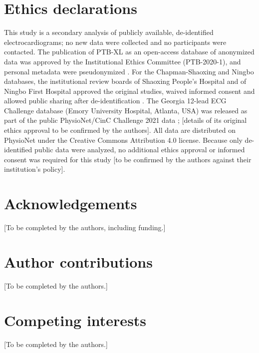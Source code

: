 \documentclass{wlscirep}
\begin{document}
\section*{Ethics declarations}
This study is a secondary analysis of publicly available, de-identified electrocardiograms; no new data were collected and no participants were contacted. The publication of PTB-XL as an open-access database of anonymized data was approved by the Institutional Ethics Committee (PTB-2020-1), and personal metadata were pseudonymized \cite{wagner2020ptbxl}. For the Chapman-Shaoxing and Ningbo databases, the institutional review boards of Shaoxing People's Hospital and of Ningbo First Hospital approved the original studies, waived informed consent and allowed public sharing after de-identification \cite{zheng2020chapman,zheng2022ningbo}. The Georgia 12-lead ECG Challenge database (Emory University Hospital, Atlanta, USA) was released as part of the public PhysioNet/CinC Challenge 2021 data \cite{reyna2021challenge,reyna2022challengedata}; [details of its original ethics approval to be confirmed by the authors]. All data are distributed on PhysioNet under the Creative Commons Attribution 4.0 license. Because only de-identified public data were analyzed, no additional ethics approval or informed consent was required for this study [to be confirmed by the authors against their institution's policy].



\section*{Acknowledgements}
[To be completed by the authors, including funding.]

\section*{Author contributions}
[To be completed by the authors.]

\section*{Competing interests}
[To be completed by the authors.]
\end{document}
